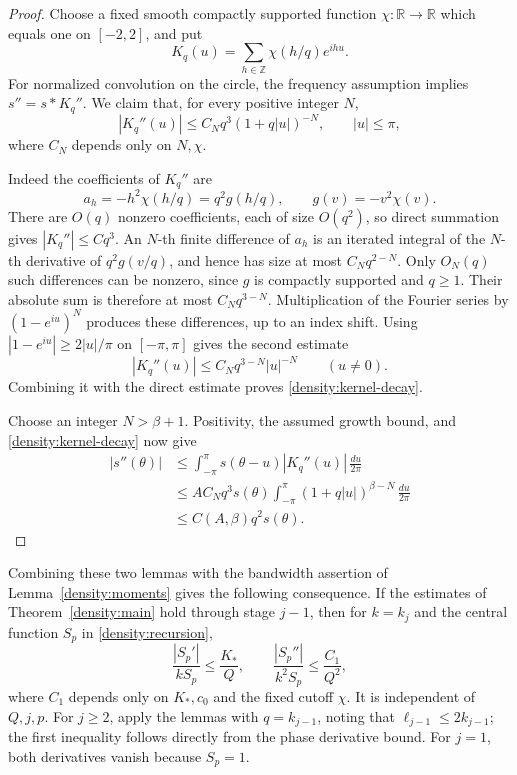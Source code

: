 \begin{proof}
Choose a fixed smooth compactly supported function
\(\chi:\mathbb R\to\mathbb R\) which equals one on \([-2,2]\), and put
\[
 K_q(u)=\sum_{h\in\mathbb Z}\chi(h/q)e^{ihu}.
\]
For normalized convolution on the circle, the frequency assumption
implies \(s''=s*K_q''\).  We claim that, for every positive integer \(N\),
\begin{equation}\label{density:kernel-decay}
 |K_q''(u)|\le C_Nq^3(1+q|u|)^{-N},
 \qquad |u|\le\pi,
\end{equation}
where \(C_N\) depends only on \(N,\chi\).

Indeed the coefficients of \(K_q''\) are
\[
 a_h=-h^2\chi(h/q)=q^2g(h/q),
 \qquad g(v)=-v^2\chi(v).
\]
There are \(O(q)\) nonzero coefficients, each of size \(O(q^2)\),
so direct summation gives \(|K_q''|\le Cq^3\).
An \(N\)-th finite difference of \(a_h\) is an iterated integral of
the \(N\)-th derivative of \(q^2g(v/q)\), and hence has size at most
\(C_Nq^{2-N}\).  Only \(O_N(q)\) such differences can be nonzero,
since \(g\) is compactly supported and \(q\ge1\).  Their absolute sum
is therefore at most \(C_Nq^{3-N}\).
Multiplication of the Fourier series by \((1-e^{iu})^N\) produces
these differences, up to an index shift.  Using
\(|1-e^{iu}|\ge2|u|/\pi\) on \([-\pi,\pi]\) gives the second estimate
\[
 |K_q''(u)|\le C_Nq^{3-N}|u|^{-N}\qquad(u\ne0).
\]
Combining it with the direct estimate proves
\eqref{density:kernel-decay}.

Choose an integer \(N>\beta+1\).
Positivity, the assumed growth bound, and
\eqref{density:kernel-decay} now give
\[
 \begin{split}
 |s''(\theta)|
 &\le\int_{-\pi}^{\pi}s(\theta-u)|K_q''(u)|
                         \,\frac{du}{2\pi}\\
 &\le AC_Nq^3s(\theta)
       \int_{-\pi}^{\pi}(1+q|u|)^{\beta-N}\,\frac{du}{2\pi}\\
 &\le C(A,\beta)q^2s(\theta).
 \end{split}
\]
\end{proof}

Combining these two lemmas with the bandwidth assertion of
Lemma~\ref{density:moments} gives the following consequence.
If the estimates of Theorem~\ref{density:main} hold through stage
\(j-1\), then for \(k=k_j\) and the central function \(S_p\) in
\eqref{density:recursion},
\begin{equation}\label{density:central-derivatives}
 \frac{|S_p'|}{kS_p}\le\frac{K_*}{Q},
 \qquad
 \frac{|S_p''|}{k^2S_p}\le\frac{C_1}{Q^2},
\end{equation}
where \(C_1\) depends only on \(K_*,c_0\) and the fixed cutoff
\(\chi\).  It is independent of \(Q,j,p\).
For \(j\ge2\), apply the lemmas with \(q=k_{j-1}\), noting that
\(\ell_{j-1}\le2k_{j-1}\); the first inequality follows directly
from the phase derivative bound.  For \(j=1\), both derivatives vanish
because \(S_p=1\).

